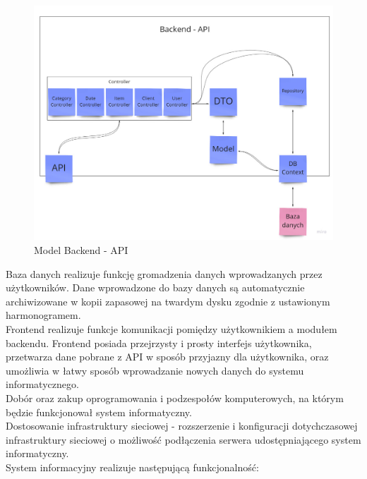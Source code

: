 \documentclass[12pt,a4paper]{article}
\begin{document}
		\begin{figure}[ht]
			\centering
			\includegraphics[width=\textwidth]{./img/Backend-API_model.jpg}
			\caption{Model Backend - API}
			\label{fig:api_model}
		\end{figure}
		\indent Baza danych realizuje funkcję gromadzenia danych wprowadzanych przez użytkowników. Dane wprowadzone do bazy danych są automatycznie archiwizowane
			w kopii zapasowej na twardym dysku zgodnie z ustawionym harmonogramem.\\
		\indent Frontend realizuje funkcje komunikacji pomiędzy użytkownikiem a modułem backendu. Frontend posiada przejrzysty i prosty interfejs użytkownika, przetwarza
			dane pobrane z API w sposób przyjazny dla użytkownika, oraz umożliwia w łatwy sposób wprowadzanie nowych danych do systemu informatycznego.\\			  
		\indent Dobór oraz zakup oprogramowania i podzespołów komputerowych, na którym będzie funkcjonował system informatyczny. \\ 
		\indent Dostosowanie infrastruktury sieciowej - rozszerzenie i konfiguracji dotychczasowej infrastruktury sieciowej o możliwość podłączenia serwera udostępniającego
			system informatyczny.\\		
		\indent System informacyjny realizuje następującą funkcjonalność:
\end{document}
